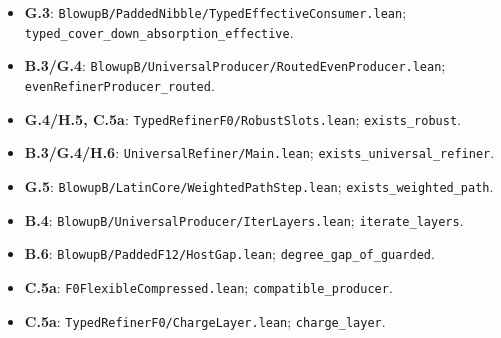 \documentclass[english,11pt,a4paper]{article}
\begin{document}
\begin{itemize}
\item
  \textbf{G.3}: \texttt{Blowup\allowbreak{}B/\allowbreak{}Padd\allowbreak{}ed\allowbreak{}Nibble/\allowbreak{}Typ\allowbreak{}ed\allowbreak{}Effective\allowbreak{}C\allowbreak{}onsumer.\allowbreak{}lean\allowbreak{}}; \texttt{typed\_\allowbreak{}cover\_\allowbreak{}\allowbreak{}down\_\allowbreak{}absorpt\allowbreak{}ion\_\allowbreak{}effectiv\allowbreak{}e}.
\item
  \textbf{B.3/G.4}: \texttt{Blowup\allowbreak{}B/\allowbreak{}Univ\allowbreak{}ersal\allowbreak{}Produce\allowbreak{}r/\allowbreak{}Routed\allowbreak{}Even\allowbreak{}\allowbreak{}Producer.\allowbreak{}lea\allowbreak{}n}; \texttt{even\allowbreak{}Refiner\allowbreak{}P\allowbreak{}roducer\_\allowbreak{}rout\allowbreak{}ed}.
\item
  \textbf{G.4/H.5, C.5a}: \texttt{Typed\allowbreak{}Refiner\allowbreak{}\allowbreak{}F0/\allowbreak{}Robust\allowbreak{}Slo\allowbreak{}ts.\allowbreak{}lean}; \texttt{exists\_\allowbreak{}robus\allowbreak{}t}.
\item
  \textbf{B.3/G.4/H.6}: \texttt{Universal\allowbreak{}Ref\allowbreak{}iner/\allowbreak{}Main.\allowbreak{}le\allowbreak{}an}; \texttt{exists\_\allowbreak{}unive\allowbreak{}rsal\_\allowbreak{}refiner\allowbreak{}}.
\item
  \textbf{G.5}: \texttt{Blowup\allowbreak{}B/\allowbreak{}Lati\allowbreak{}n\allowbreak{}Core/\allowbreak{}Weight\allowbreak{}ed\allowbreak{}Path\allowbreak{}Step.\allowbreak{}l\allowbreak{}ean}; \texttt{exists\_\allowbreak{}weigh\allowbreak{}ted\_\allowbreak{}path}.
\item
  \textbf{B.4}: \texttt{Blowup\allowbreak{}B/\allowbreak{}Univ\allowbreak{}ersal\allowbreak{}Produce\allowbreak{}r/\allowbreak{}Iter\allowbreak{}Layers\allowbreak{}.\allowbreak{}lean}; \texttt{iterate\_\allowbreak{}laye\allowbreak{}rs}.
\item
  \textbf{B.6}: \texttt{Blowup\allowbreak{}B/\allowbreak{}Padd\allowbreak{}ed\allowbreak{}F12/\allowbreak{}Host\allowbreak{}Ga\allowbreak{}p.\allowbreak{}lean}; \texttt{degree\_\allowbreak{}gap\_\allowbreak{}o\allowbreak{}f\_\allowbreak{}guarded}.
\item
  \textbf{C.5a}: \texttt{F0Flexible\allowbreak{}Co\allowbreak{}mpressed.\allowbreak{}lea\allowbreak{}n}; \texttt{compatible\_\allowbreak{}p\allowbreak{}roducer}.
\item
  \textbf{C.5a}: \texttt{Typed\allowbreak{}Refiner\allowbreak{}\allowbreak{}F0/\allowbreak{}Charge\allowbreak{}Lay\allowbreak{}er.\allowbreak{}lean}; \texttt{charge\_\allowbreak{}layer\allowbreak{}}.

\end{itemize}
\end{document}
